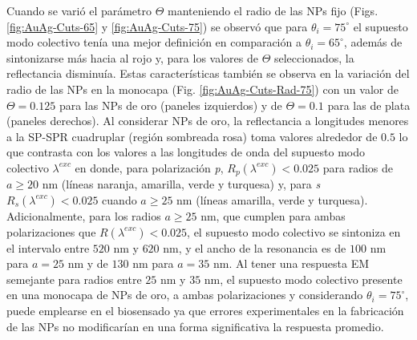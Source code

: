 Cuando se varió el parámetro $\Theta$ manteniendo el radio de las NPs fijo (Figs. \ref{fig:AuAg-Cuts-65} y \ref{fig:AuAg-Cuts-75}) se observó que para $\theta_i=75^\circ$  el supuesto modo colectivo tenía una mejor definición en comparación a $\theta_i =65^\circ$, además de sintonizarse más hacia al rojo y, para los valores de $\Theta$ seleccionados, la reflectancia disminuía. Estas características también se observa en la variación del radio de las NPs en la monocapa (Fig. \ref{fig:AuAg-Cuts-Rad-75})  con un valor de $\Theta=0.125$ para las NPs de oro (paneles izquierdos) y de $\Theta=0.1$ para las de plata (paneles derechos). Al considerar NPs de oro, la reflectancia a longitudes menores a la SP-SPR cuadruplar (región sombreada rosa) toma valores alrededor de $0.5$  lo que contrasta con los valores a las longitudes de onda del supuesto modo colectivo $\lambda^{exc}$ en donde, para polarización \emph{p}, $R_p(\lambda^{exc})<0.025$ para radios de $a\geq 20$ nm (líneas naranja, amarilla, verde y turquesa) y, para \emph{s} $R_s(\lambda^{exc})<0.025$ cuando $a\geq 25$ nm (líneas amarilla, verde y turquesa). Adicionalmente, para los radios  $a\geq 25$ nm, que cumplen para ambas polarizaciones que $R(\lambda^{exc})<0.025$, el supuesto modo colectivo se sintoniza en el intervalo entre $520$ nm y $620$ nm, y el ancho de la resonancia es de $100$ nm para $a=25$ nm y de $130$ nm para $a=35$ nm. Al tener una respuesta EM semejante para radios entre $25$ nm y $35$ nm, el supuesto modo colectivo presente en una monocapa de NPs de oro, a ambas polarizaciones y considerando $\theta_i=75^\circ$, puede emplearse en el biosensado ya que errores experimentales en la fabricación de las NPs no modificarían en una forma significativa la respuesta promedio.


